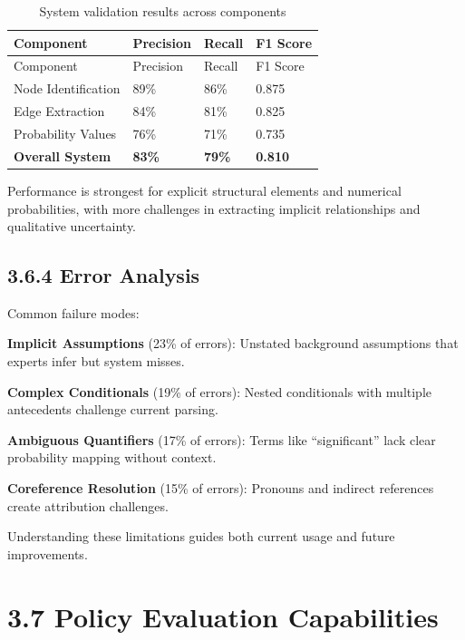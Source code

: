 \documentclass[
  11pt,
  letterpaper,
]{book}
\begin{document}
\begin{longtable}[]{@{}llll@{}}
\caption{System validation results across
components}\label{tbl-validation-summary}\tabularnewline
\toprule\noalign{}
Component & Precision & Recall & F1 Score \\
\midrule\noalign{}
\endfirsthead
\toprule\noalign{}
Component & Precision & Recall & F1 Score \\
\midrule\noalign{}
\endhead
\bottomrule\noalign{}
\endlastfoot
Node Identification & 89\% & 86\% & 0.875 \\
Edge Extraction & 84\% & 81\% & 0.825 \\
Probability Values & 76\% & 71\% & 0.735 \\
\textbf{Overall System} & \textbf{83\%} & \textbf{79\%} &
\textbf{0.810} \\
\end{longtable}

Performance is strongest for explicit structural elements and numerical
probabilities, with more challenges in extracting implicit relationships
and qualitative uncertainty.

\subsection*{3.6.4 Error Analysis}\label{sec-error-analysis}

Common failure modes:

\textbf{Implicit Assumptions} (23\% of errors): Unstated background
assumptions that experts infer but system misses.

\textbf{Complex Conditionals} (19\% of errors): Nested conditionals with
multiple antecedents challenge current parsing.

\textbf{Ambiguous Quantifiers} (17\% of errors): Terms like
``significant'' lack clear probability mapping without context.

\textbf{Coreference Resolution} (15\% of errors): Pronouns and indirect
references create attribution challenges.

Understanding these limitations guides both current usage and future
improvements.

\section*{3.7 Policy Evaluation
Capabilities}\label{sec-policy-evaluation}
\end{document}
